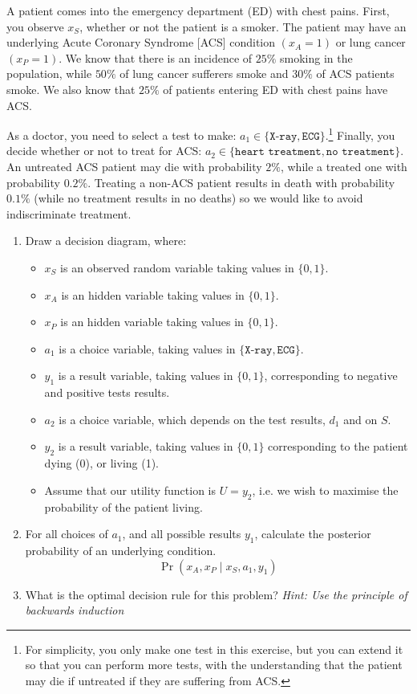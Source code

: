 \documentclass[twoside,a4paper]{article}
\begin{document}
\begin{exercise}
  A patient comes into the emergency department (ED) with chest pains.  First, you observe $x_S$, whether or not the patient is a smoker. The patient may have an underlying Acute Coronary Syndrome [ACS] condition $(x_A = 1)$ or lung cancer $(x_P = 1)$. We know that there is an incidence of $25\%$ smoking in the population, while $50\%$ of lung cancer sufferers smoke and $30\%$ of ACS patients smoke. We also know that $25\%$ of patients entering ED with chest pains have ACS. 

  As a doctor, you need to select a test to make:
  $a_1 \in \{\texttt{X-ray}, \texttt{ECG}\}$.\footnote{For simplicity,
    you only make one test in this exercise, but you can extend it so
    that you can perform more tests, with the understanding that the patient may die if untreated if they are suffering from ACS.}  Finally, you decide whether or
not to treat for ACS:
$a_2 \in \{\texttt{heart treatment}, \texttt{no treatment}\}$. An
untreated ACS patient may die with probability $2\%$, while a treated
one with probability $0.2\%$. Treating a non-ACS patient results in
death with probability $0.1\%$ (while no treatment results in no deaths) so we would like to avoid indiscriminate treatment.
  \begin{enumerate}
  \item Draw a decision diagram, where:
    \begin{itemize}
    \item $x_S$ is an observed random variable taking values in $\{0, 1\}$.
    \item $x_A$ is an hidden variable taking values in $\{0, 1\}$.
    \item $x_P$ is an hidden variable taking values in $\{0, 1\}$.
    \item $a_1$ is a choice variable, taking values in $\{\texttt{X-ray}, \texttt{ECG}\}$. 
    \item $y_1$ is a result variable, taking values in
      $\{0, 1\}$, corresponding to negative and positive tests results.
    \item $a_2$ is a choice variable, which depends on the test results, $d_1$ and on $S$.
    \item $y_2$ is a result variable, taking values in $\{0,1\}$ corresponding to the patient dying (0), or living (1).
    \item Assume that our utility function is $U = y_2$, i.e. we wish to maximise the probability of the patient living.
    \end{itemize}
  \item For all choices of $a_1$, and all possible results $y_1$, calculate the posterior probability of an underlying condition.
    \[
      \Pr(x_A, x_P \mid x_S, a_1, y_1)
    \]
  \item What is the optimal decision rule for this problem? \emph{Hint: Use the principle of backwards induction}
  \end{enumerate}
  \label{ex:diagnostic-test}
\end{exercise}
\end{document}
